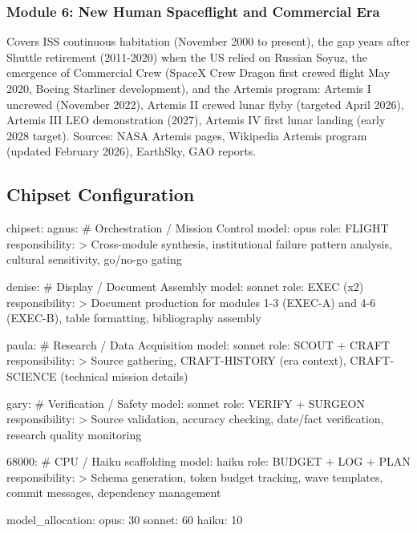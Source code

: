 \documentclass[11pt,letterpaper]{article}
\begin{document}
\subsubsection{Module 6: New Human Spaceflight and Commercial Era}

Covers ISS continuous habitation (November 2000 to present), the gap years after Shuttle retirement (2011-2020) when the US relied on Russian Soyuz, the emergence of Commercial Crew (SpaceX Crew Dragon first crewed flight May 2020, Boeing Starliner development), and the Artemis program: Artemis I uncrewed (November 2022), Artemis II crewed lunar flyby (targeted April 2026), Artemis III LEO demonstration (2027), Artemis IV first lunar landing (early 2028 target). Sources: NASA Artemis pages, Wikipedia Artemis program (updated February 2026), EarthSky, GAO reports.

\subsection{Chipset Configuration}

\begin{asciibox}
chipset:
  agnus:          # Orchestration / Mission Control
    model: opus
    role: FLIGHT
    responsibility: >
      Cross-module synthesis, institutional failure pattern analysis,
      cultural sensitivity, go/no-go gating

  denise:         # Display / Document Assembly
    model: sonnet
    role: EXEC (x2)
    responsibility: >
      Document production for modules 1-3 (EXEC-A) and 4-6 (EXEC-B),
      table formatting, bibliography assembly

  paula:          # Research / Data Acquisition
    model: sonnet
    role: SCOUT + CRAFT
    responsibility: >
      Source gathering, CRAFT-HISTORY (era context),
      CRAFT-SCIENCE (technical mission details)

  gary:           # Verification / Safety
    model: sonnet
    role: VERIFY + SURGEON
    responsibility: >
      Source validation, accuracy checking, date/fact verification,
      research quality monitoring

  68000:          # CPU / Haiku scaffolding
    model: haiku
    role: BUDGET + LOG + PLAN
    responsibility: >
      Schema generation, token budget tracking, wave templates,
      commit messages, dependency management

model_allocation:
  opus: 30%
  sonnet: 60%
  haiku: 10%
\end{asciibox}
\end{document}

